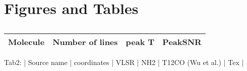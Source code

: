 \section{Figures and Tables}

\begin{table}
\caption{}
\begin{tabular}{|c|c|c|c|}
\hline
Molecule & Number of lines & peak T & PeakSNR\\
\hline
\hline
\end{tabular}
\end{table}

 Tab2: | Source name | coordinates | VLSR | NH2 | T12CO (Wu et al.) | Tex | 

 
  
  
  
  
  
  
  
  
  
  
  